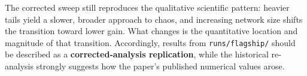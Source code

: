 \documentclass[11pt]{article}
\begin{document}
The corrected sweep still reproduces the qualitative scientific pattern:
heavier tails yield a slower, broader approach to chaos, and increasing
network size shifts the transition toward lower gain. What changes is the
quantitative location and magnitude of that transition. Accordingly, results
from \texttt{runs/flagship/} should be described as a \textbf{corrected-analysis
replication}, while the historical re-analysis strongly suggests how the
paper's published numerical values arose.
\end{document}
